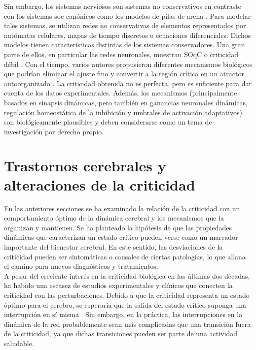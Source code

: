 Sin embargo, los sistemas nerviosos son sistemas no conservativos en contraste con los sistemas \gls{soc}  canónicos como los modelos de pilas de arena \cite{jensen_self-organized_1998,pruessner_self-organised_2012}. Para modelar tales sistemas, se utilizan redes no conservativas de elementos representados por autómatas celulares, mapas de tiempo discretos o ecuaciones diferenciales. Dichos modelos tienen características distintas de los sistemas conservadores. Una gran parte de ellos, en particular las redes neuronales, muestran \gls{SOqC} \cite{bonachela_self-organization_2009,bonachela_self-organization_2010,buendia_feedback_2020} o criticidad débil \cite{palmieri_emergence_2018,palmieri_forest_2020}. Con el tiempo, varios autores propusieron diferentes mecanismos biológicos que podrían eliminar el ajuste fino y convertir a la región crítica en un atractor autoorganizado \cite{kinouchi_mechanisms_2020,zeraati_self-organization_2021,meisel_adaptive_2009,droste_analytical_2013,tetzlaff_self-organized_2010,meisel_failure_2012,rocha_homeostatic_2018,plenz_self-organized_2021,levina_phase_2009,ma_cortical_2019}. La criticidad obtenida no es perfecta, pero es suficiente para dar cuenta de los datos experimentales. Además, los mecanismos (principalmente basados en sinapsis dinámicas, pero también en ganancias neuronales dinámicas, regulación homeostática de la inhibición y umbrales de activación adaptativos) son biológicamente plausibles y deben considerarse como un tema de investigación por derecho propio.


\section{Trastornos cerebrales y alteraciones de la criticidad}


En las anteriores secciones se ha examinado la relación de la criticidad con un comportamiento óptimo de la dinámica cerebral y los mecanismos que la organizan y mantienen. Se ha planteado la hipótesis de que las propiedades dinámicas que caracterizan un estado crítico pueden verse como un marcador importante del bienestar cerebral. En este sentido, las desviaciones de la criticidad pueden ser sintomáticas o causales de ciertas patologías, lo que allana el camino para nuevos diagnósticos y tratamientos.\\

A pesar del creciente interés en la criticidad biológica en las últimas dos décadas, ha habido una escasez de estudios experimentales y clínicos que conecten la criticidad con las perturbaciones. Debido a que la criticidad representa un estado óptimo para el cerebro, se esperaría que la salida del estado crítico suponga una interrupción en sí misma \cite{heiney_criticality_2021}. Sin embargo, en la práctica, las interrupciones en la dinámica de la red probablemente sean más complicadas que una transición fuera de la criticidad, ya que dichas transiciones pueden ser parte de una actividad saludable.\\

